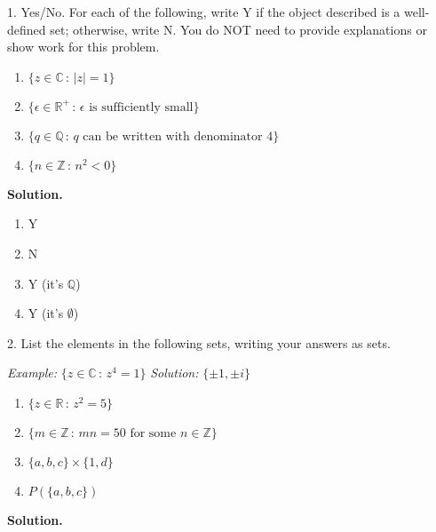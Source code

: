 \documentclass[10pt,]{book}
\theoremstyle{plain}
\theoremstyle{definition}
\theoremstyle{definition}
\theoremstyle{definition}
\theoremstyle{definition}
\numberwithin{equation}{section}
\def\Z{\mathbb{Z}}
\def\R{\mathbb{R}}
\def\Q{\mathbb{Q}}
\def\C{\mathbb{C}}
\newcommand{\lt}{<}
\begin{document}
\begin{exerciselist}
\item[1.]\hypertarget{exercise-1}{}Yes/No. For each of the following, write Y if the object described is a well-defined set; otherwise, write N. You do NOT need to provide explanations or show work for this problem. \leavevmode%
\begin{enumerate}[label=(\alph*)]
\item\hypertarget{li-23}{}\(\{z \in \C \,:\, |z|=1\}\)%
\item\hypertarget{li-24}{}\(\{\epsilon \in \R^+\,:\, \epsilon \mbox{ is sufficiently small} \}\)%
\item\hypertarget{li-25}{}\(\{q\in \Q \,:\, q \mbox{ can be written  with denominator } 4\}\)%
\item\hypertarget{li-26}{}\(\{n \in \Z\,:\, n^2 \lt 0\}\)%
\end{enumerate}
%
\par\smallskip
\par\smallskip
\noindent\textbf{Solution.}\hypertarget{solution-1}{}\quad
\leavevmode%
\begin{multicols}{4}
\begin{enumerate}[label=(\alph*)]
\item\hypertarget{li-27}{}Y%
\item\hypertarget{li-28}{}N%
\item\hypertarget{li-29}{}Y (it's \(\Q\))%
\item\hypertarget{li-30}{}Y (it's \(\emptyset\))%
\end{enumerate}
\end{multicols}
%
\item[2.]\hypertarget{exercise-2}{}List the elements in the following sets, writing your answers as sets.%
\par
\emph{Example:} \(\{z\in \C\,:\,z^4=1\}\) \emph{Solution:} \(\{\pm 1, \pm i\}\) \leavevmode%
\begin{enumerate}[label=(\alph*)]
\item\hypertarget{li-31}{}\(\{z\in \R\,:\, z^2=5\}\)%
\item\hypertarget{li-32}{}\(\{m \in \Z\,:\, mn=50 \mbox{ for some } n\in \Z\}\)%
\item\hypertarget{li-33}{}\(\{a,b,c\}\times \{1,d\}\)%
\item\hypertarget{li-34}{}\(P(\{a,b,c\})\)%
\end{enumerate}
%
\par\smallskip
\par\smallskip
\noindent\textbf{Solution.}\hypertarget{solution-2}{}\quad

\end{exerciselist}
\end{document}
